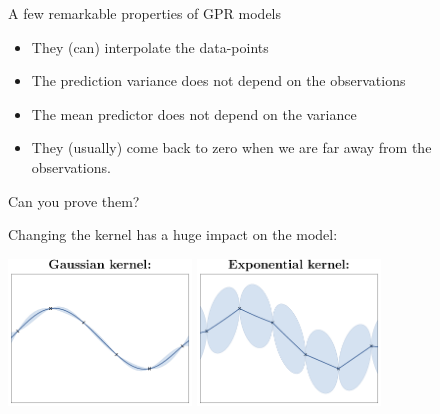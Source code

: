 \begin{frame}{}
A few remarkable properties of GPR models
\begin{itemize}
	\item They (can) interpolate the data-points
	\item The prediction variance does not depend on the observations
	\item The mean predictor does not depend on the variance
	\item They (usually) come back to zero when we are far away from the observations.
\end{itemize}
Can you prove them?
\end{frame}


\begin{frame}{}
Changing the kernel \alert{has a huge impact on the model}:\\
\vspace{5mm}
\begin{center}
\includegraphics[height=3.9cm]{1_stat_models/figures/Fig2-GP-rbf} \qquad
\includegraphics[height=3.9cm]{1_stat_models/figures/Fig2-GP-exp}
\end{center}
\end{frame}

